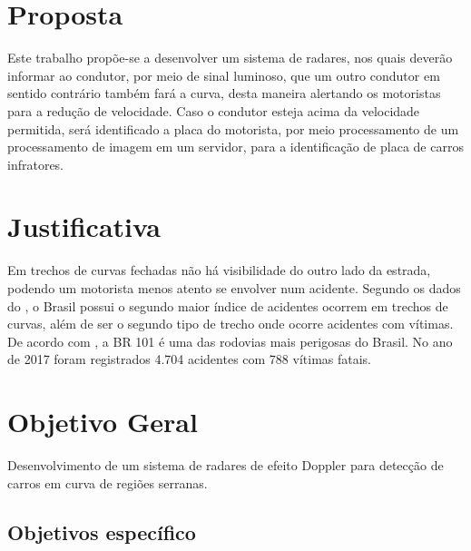 \section{Proposta}

Este trabalho propõe-se a desenvolver um sistema de radares, nos quais deverão informar ao condutor, por meio de sinal luminoso, que um outro condutor em sentido contrário também fará a curva, desta maneira alertando os motoristas para a redução de velocidade. Caso o condutor esteja acima da velocidade permitida, será identificado a placa do motorista, por meio processamento de um processamento de imagem em um servidor, para a identificação de placa de carros infratores.



\section{Justificativa}

Em trechos de curvas fechadas não há visibilidade do outro lado da estrada, podendo um motorista menos atento se envolver num acidente. Segundo os dados do \cite{anuario_rodoviario}, o Brasil possui o segundo maior índice de acidentes ocorrem em trechos de curvas, além de ser o segundo tipo de trecho onde ocorre acidentes com vítimas. De acordo com \cite{anuario_rodoviario}, a BR 101 é uma das rodovias mais perigosas do Brasil. No ano de 2017 foram registrados 4.704 acidentes com 788 vítimas fatais. 

\section{Objetivo Geral}

Desenvolvimento de um sistema de radares de efeito Doppler para detecção de carros em curva de regiões serranas.


\subsection{Objetivos específico}

